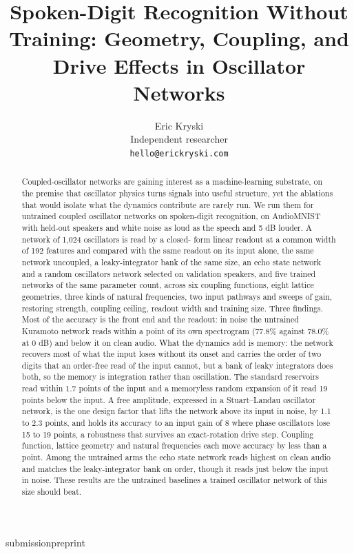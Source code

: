 \documentclass{article}
\title{Spoken-Digit Recognition Without Training: Geometry, Coupling,
and Drive Effects in Oscillator Networks}
\author{Eric Kryski \\
Independent researcher \\
\texttt{hello@erickryski.com}}
\begin{document}
\maketitle
\def\iclrface{submission}\def\iclrpreprint{preprint}
\ifx\iclrface\iclrpreprint\lhead{}\fi
\begin{abstract}
Coupled-oscillator networks are gaining interest as a machine-learning
substrate, on the premise that oscillator physics turns signals into
useful structure, yet the ablations that would isolate what the dynamics
contribute are rarely run. We run them for untrained coupled oscillator
networks on spoken-digit recognition, on AudioMNIST with held-out
speakers and white noise as loud as the speech and 5 dB louder. A
network of 1,024 oscillators is read by a closed- form linear readout at
a common width of 192 features and compared with the same readout on its
input alone, the same network uncoupled, a leaky-integrator bank of the
same size, an echo state network and a random oscillators network
selected on validation speakers, and five trained networks of the same
parameter count, across six coupling functions, eight lattice
geometries, three kinds of natural frequencies, two input pathways and
sweeps of gain, restoring strength, coupling ceiling, readout width and
training size. Three findings. Most of the accuracy is the front end and
the readout: in noise the untrained Kuramoto network reads within a
point of its own spectrogram (77.8\% against 78.0\% at 0 dB) and below
it on clean audio. What the dynamics add is memory: the network recovers
most of what the input loses without its onset and carries the order of
two digits that an order-free read of the input cannot, but a bank of
leaky integrators does both, so the memory is integration rather than
oscillation. The standard reservoirs read within 1.7 points of the input
and a memoryless random expansion of it read 19 points below the input.
A free amplitude, expressed in a Stuart--Landau oscillator network, is
the one design factor that lifts the network above its input in noise,
by 1.1 to 2.3 points, and holds its accuracy to an input gain of 8 where
phase oscillators lose 15 to 19 points, a robustness that survives an
exact-rotation drive step. Coupling function, lattice geometry and
natural frequencies each move accuracy by less than a point. Among the
untrained arms the echo state network reads highest on clean audio and
matches the leaky-integrator bank on order, though it reads just below
the input in noise. These results are the untrained baselines a trained
oscillator network of this size should beat.
\end{abstract}
\end{document}
